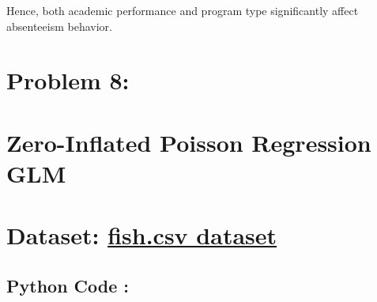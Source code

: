 \documentclass[
]{article}
\begin{document}
Hence, both academic performance and program type significantly affect
absenteeism behavior.

\section{\texorpdfstring{\textbf{Problem
8:}}{Problem 8:}}\label{problem-8}

\section{\texorpdfstring{Zero-Inflated Poisson Regression GLM
}{Zero-Inflated Poisson Regression GLM }}\label{zero-inflated-poisson-regression-glm}

\section{\texorpdfstring{Dataset:
\href{https://stats.idre.ucla.edu/stat/data/fish.csv?utm_source=chatgpt.com}{fish.csv
dataset}}{Dataset: fish.csv dataset}}\label{dataset-fish.csv-dataset}

\subsection{}\label{section-6}

\subsection{\texorpdfstring{\textbf{Python Code
:}}{Python Code :}}\label{python-code-13}
\end{document}
